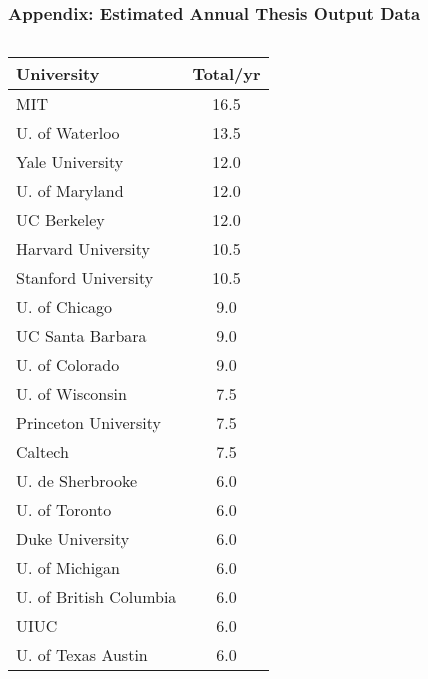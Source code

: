 \documentclass[aspectratio=169]{beamer}
\begin{document}
\begin{frame}[fragile]
    \frametitle{Appendix: Estimated Annual Thesis Output Data}
    \vspace{-2mm}
    \footnotesize 
    \begin{columns}[T]
        \begin{column}{0.5\textwidth}
            \begin{tabularx}{\linewidth}{lS[table-format=2.1]}
                \toprule
                \textbf{University} & {\textbf{Total/yr}} \\
                \midrule
                MIT & 16.5 \\
                U. of Waterloo & 13.5 \\
                Yale University & 12.0 \\
                U. of Maryland & 12.0 \\
                UC Berkeley & 12.0 \\
                Harvard University & 10.5 \\
                Stanford University & 10.5 \\
                U. of Chicago & 9.0 \\
                UC Santa Barbara & 9.0 \\
                U. of Colorado & 9.0 \\
                U. of Wisconsin & 7.5 \\
                Princeton University & 7.5 \\
                Caltech & 7.5 \\
                U. de Sherbrooke & 6.0 \\
                U. of Toronto & 6.0 \\
                Duke University & 6.0 \\
                U. of Michigan & 6.0 \\
                U. of British Columbia & 6.0 \\
                UIUC & 6.0 \\
                U. of Texas Austin & 6.0 \\
                \bottomrule
            \end{tabularx}
        \end{column}
        \begin{column}{0.5\textwidth}
            \begin{tabularx}{\linewidth}{lS[table-format=1.1]}

\end{tabularx}
\end{column}
\end{columns}
\end{frame}
\end{document}

